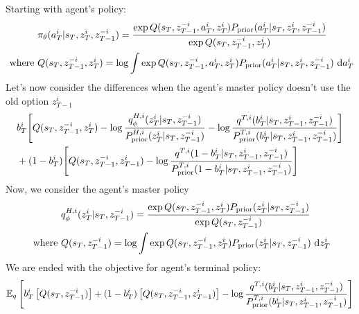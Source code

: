 Starting with agent's policy:
\begin{equation}
\begin{aligned}
    &\pi_\theta(a^i_T | s_T, z^i_T, z^{-i}_{T-1}) = \frac{\exp Q(s_T,  z^{-i}_{T-1}, a^i_T, z^i_T) P_{\text{prior}}(a^i_T | s_T, z^i_T, z^{-i}_{T-1})}{\exp Q(s_T,  z^{-i}_{T-1}, z^i_T)} \\
    \text{ where }&Q(s_T,  z^{-i}_{T-1}, z^i_T) = \log \int \exp Q(s_T,  z^{-i}_{T-1}, a^i_T, z^i_T) P_{\text{prior}}(a^i_T | s_T, z^i_T, z^{-i}_{T-1}) \ \mathrm{d} a^i_T
\end{aligned}
\end{equation}
Let's now consider the differences when the agent's master policy doesn't use the old option $z^i_{T-1}$
\begin{equation}
\begin{aligned}
    &b_T^{i}\begin{aligned}[t]
    \Bigg[ Q(s_T,  z^{-i}_{T-1}, z^i_T) - \log\frac{q^{H, i}_{\phi}(z_T^i | s_T, z^{-i}_{T-1})}{P^{H, i}_{\text{prior}}(z_T^i | s_T, z^{-i}_{T-1})} -  \log\frac{q^{T,i}(b^i_T | s_T, z^i_{T-1}, z^{-i}_{T-1})}{P^{T,i}_{\text{prior}}(b^i_T | s_T, z^i_{T-1}, z^{-i}_{T-1})}\Bigg]
    \end{aligned} \\
    &+(1-b_T^i)\begin{aligned}[t]
    \Bigg[ Q(s_T,  z^{-i}_{T-1}, z^i_{T-1})-  \log\frac{q^{T,i}(1-b^i_T | s_T, z^i_{T-1}, z^{-i}_{T-1})}{P^{T,i}_{\text{prior}}(1-b^i_T | s_T, z^i_{T-1}, z^{-i}_{T-1})} \Bigg]
    \end{aligned} \\
\end{aligned}
\end{equation}
Now, we consider the agent's master policy
\begin{equation}
\begin{aligned}
    &q^{H, i}_{\phi}(z_T^i | s_T, z^{-i}_{T-1}) = \frac{\exp Q(s_T,  z^{-i}_{T-1}, z^i_T) P_{\text{prior}}(z_T^i | s_T, z^{-i}_{T-1})}{\exp Q(s_T,  z^{-i}_{T-1})} \\
    \text{ where }&Q(s_T,  z^{-i}_{T-1}) = \log \int\exp Q(s_T,  z^{-i}_{T-1}, z^i_T) P_{\text{prior}}(z_T^i | s_T, z^{-i}_{T-1}) \ \mathrm{d} z_T^i
\end{aligned}
\end{equation}
We are ended with the objective for agent's terminal policy:
\begin{equation}
\mathbb{E}_q\left[ b^i_T\left[ Q(s_T,  z^{-i}_{T-1}) \right] + (1-b^i_T)\left[ Q(s_T,  z^{-i}_{T-1}, z^i_{T-1}) \right] - \log\frac{q^{T,i}(b^i_T | s_T, z^i_{T-1}, z^{-i}_{T-1})}{P^{T,i}_{\text{prior}}(b^i_T | s_T, z^i_{T-1}, z^{-i}_{T-1})} \right]
\end{equation}
